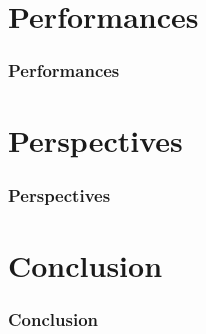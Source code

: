 \documentclass{beamer}
\begin{document}
\section{Performances}

\begin{frame}
  \frametitle{Performances}
\end{frame}

\section{Perspectives}

\begin{frame}
  \frametitle{Perspectives}
\end{frame}

\section{Conclusion}

\begin{frame}
  \frametitle{Conclusion}
\end{frame}


 
\end{document}
